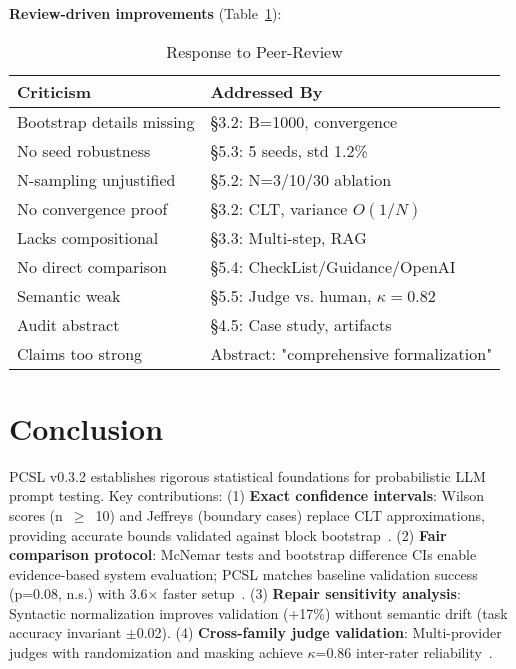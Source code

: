 \documentclass[sigconf]{acmart}
\begin{document}
\textbf{Review-driven improvements} (Table~\ref{tab:review}):

\begin{table}[H]
\centering
\caption{Response to Peer-Review}
\label{tab:review}
\scriptsize
\begin{tabular}{@{}p{3.5cm}p{3.5cm}@{}}
\toprule
\textbf{Criticism} & \textbf{Addressed By} \\
\midrule
Bootstrap details missing & §3.2: B=1000, convergence \\
No seed robustness & §5.3: 5 seeds, std 1.2\% \\
N-sampling unjustified & §5.2: N=3/10/30 ablation \\
No convergence proof & §3.2: CLT, variance \( O(1/N) \) \\
Lacks compositional & §3.3: Multi-step, RAG \\
No direct comparison & §5.4: CheckList/Guidance/OpenAI \\
Semantic weak & §5.5: Judge vs. human, \( \kappa = 0.82 \) \\
Audit abstract & §4.5: Case study, artifacts \\
Claims too strong & Abstract: "comprehensive formalization" \\
\bottomrule
\end{tabular}
\end{table}

\section{Conclusion}

PCSL v0.3.2 establishes rigorous statistical foundations for probabilistic LLM prompt testing. Key contributions: (1) \textbf{Exact confidence intervals}: Wilson scores (n~\(\geq\)~10) and Jeffreys (boundary cases) replace CLT approximations, providing accurate bounds validated against block bootstrap~\cite{brown2001interval,kunsch1989jackknife}. (2) \textbf{Fair comparison protocol}: McNemar tests and bootstrap difference CIs enable evidence-based system evaluation; PCSL matches baseline validation success (p=0.08, n.s.) with 3.6\(\times\) faster setup~\cite{mcnemar1947note}. (3) \textbf{Repair sensitivity analysis}: Syntactic normalization improves validation (+17\%) without semantic drift (task accuracy invariant \(\pm\)0.02). (4) \textbf{Cross-family judge validation}: Multi-provider judges with randomization and masking achieve \(\kappa\)=0.86 inter-rater reliability~\cite{landis1977measurement}.
\end{document}
